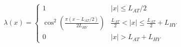 \documentclass[12pt]{article}
\begin{document}
$$
\lambda(x)=\left\{
\begin{array}{ll}
1 & |x| \leq L_{AT}/2\\
\cos^2\left(\frac{\pi(x-L_{AT}/2)}{2L_{HY}}\right) & \frac{L_{AT}}{2}< |x| \leq \frac{L_{AT}}{2}+L_{HY}\\
0 & |x| > L_{AT}+L_{HY}
\end{array}
\right.
$$
\end{document}

